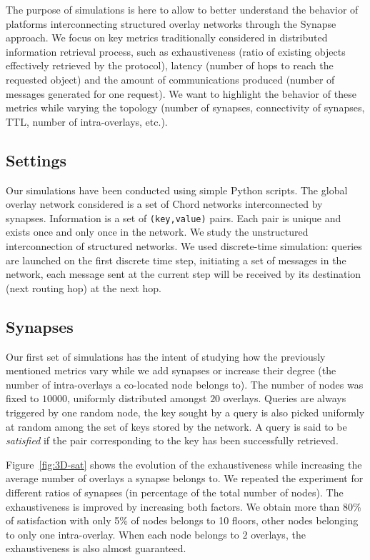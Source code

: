 
The purpose of simulations is here to allow to better understand the
behavior of platforms interconnecting structured overlay networks through
the Synapse approach. We focus on key metrics traditionally considered
in distributed information retrieval process, such as exhaustiveness
(ratio of existing objects effectively retrieved by the protocol),
latency (number of hops to reach the requested object) and the amount
of communications produced (number of messages generated for one
request). We want to highlight the behavior of these metrics while
varying the topology  (number of synapses, connectivity of
synapses, TTL, number of intra-overlays, etc.).

\subsection{Settings}
%
Our simulations have been conducted using simple Python scripts. The
global overlay network considered is a set of Chord networks
interconnected by synapses. Information is a set of {\tt (key,value)}
pairs. Each pair is unique and exists once and only once in the
network. We study the unstructured interconnection of structured
networks. We used discrete-time simulation: queries are launched on
the first discrete time step, initiating a set of messages in the
network, each message sent at the current step will be received by its destination (next routing hop) at the next hop.

\subsection{Synapses}
%
Our first set of simulations has the intent of studying how the
previously mentioned metrics vary while we add synapses or increase
their degree (the number of intra-overlays a co-located node belongs
to). The number of nodes was fixed to $10000$, uniformly distributed
amongst $20$ overlays. Queries are always triggered by one random
node, the key sought by a query is also picked uniformly at random
among the set of keys stored by the network. A query is said to be
\emph{satisfied} if the pair corresponding to the key has been
successfully retrieved.

Figure~\ref{fig:3D-sat} shows the evolution of the exhaustiveness
while increasing the average number of overlays a synapse belongs
to. We repeated the experiment for different ratios of synapses (in
percentage of the total number of nodes). The exhaustiveness is
improved by increasing both factors. We obtain more than 80\% of
satisfaction with only 5\% of nodes belongs to 10 floors, other nodes
belonging to only one intra-overlay. When each node belongs to $2$
overlays, the exhaustiveness is also almost guaranteed.

